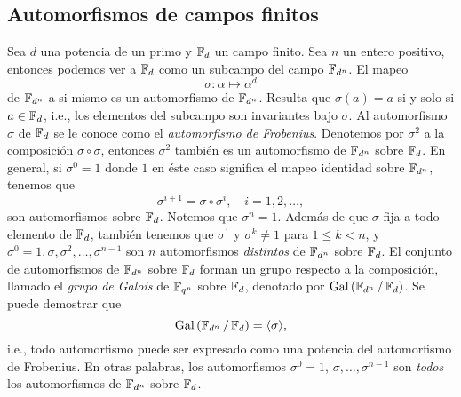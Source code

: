 \subsection{Automorfismos de campos finitos}

Sea $d$ una potencia de un primo y $\operatorname{\mathbb{F}}_d$ un campo finito.
Sea $n$ un entero positivo, entonces podemos ver a $\operatorname{\mathbb{F}}_d$
como un subcampo del campo $\operatorname{\mathbb{F}}_{d^{n}}$. El mapeo
\begin{equation}
  \sigma : \alpha \mapsto \alpha^{d}
\end{equation}
de $\operatorname{\mathbb{F}}_{d^{n}}$ a si mismo es un automorfismo de
$\operatorname{\mathbb{F}}_{d^{n}}$. Resulta que $\sigma(a) = a$ si y solo si $a
\in \operatorname{\mathbb{F}}_d$, i.e., los elementos del subcampo son invariantes
bajo $\sigma$. Al automorfismo $\sigma$ de $\operatorname{\mathbb{F}}_d$ se le
conoce como el \textit{automorfismo de Frobenius}. Denotemos
por $\sigma^2$ a la composición $\sigma \circ \sigma$,
entonces $\sigma^2$ también es un automorfismo de
$\operatorname{\mathbb{F}}_{d^{n}}$ sobre $\operatorname{\mathbb{F}}_d$. En general, si $\sigma^{0} = 1$
donde $1$ en éste caso significa el mapeo identidad sobre
$\operatorname{\mathbb{F}}_{d^{n}}$, tenemos que
\begin{equation}
  \sigma^{i+1}
  = \sigma \circ \sigma^{i},
  \quad i = 1,2,\ldots,
\end{equation}
son automorfismos sobre $\operatorname{\mathbb{F}}_d$. Notemos que $\sigma^{n} =
1$. Además de que $\sigma$ fija a todo elemento de $\operatorname{\mathbb{F}}_d$,
también tenemos que $\sigma^{1}$ y $\sigma^{k} \neq 1$ para
$1 \leq k < n$, y $\sigma^{0} = 1, \sigma, \sigma^2, \ldots,
\sigma^{n-1}$ son $n$ automorfismos \textit{distintos} de
$\operatorname{\mathbb{F}}_{d^{n}}$ sobre $\operatorname{\mathbb{F}}_d$. El conjunto de automorfismos
de $\operatorname{\mathbb{F}}_{d^{n}}$ sobre $\operatorname{\mathbb{F}}_d$ forman un grupo respecto a la
composición, llamado el \textit{grupo de Galois} de
$\operatorname{\mathbb{F}}_{q^{n}}$ sobre $\operatorname{\mathbb{F}}_d$, denotado por
$\operatorname{Gal}\left(\operatorname{\mathbb{F}}_{d^{n}} / \operatorname{\mathbb{F}}_d\right)$.  Se puede demostrar
que
\begin{equation}
  \operatorname{Gal}\left( \operatorname{\mathbb{F}}_{d^{n}} / \operatorname{\mathbb{F}}_d \right) 
  = \langle \sigma \rangle,
\end{equation}
i.e., todo automorfismo puede ser expresado como una
potencia del automorfismo de Frobenius. En otras palabras,
los automorfismos $\sigma^{0} = 1$, $\sigma, \ldots,
\sigma^{n-1}$ son \textit{todos} los automorfismos de
$\operatorname{\mathbb{F}}_{d^{n}}$ sobre $\operatorname{\mathbb{F}}_d$.

